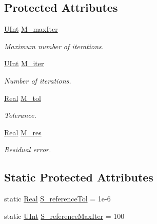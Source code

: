 \subsection*{Protected Attributes}
\begin{DoxyCompactItemize}
\item 
\hyperlink{namespaceFVCode3D_a4bf7e328c75d0fd504050d040ebe9eda}{U\+Int} \hyperlink{classFVCode3D_1_1IterativeSolver_a063b910ea559ee5c1907a611a0aa3ef5}{M\+\_\+max\+Iter}
\begin{DoxyCompactList}\small\item\em Maximum number of iterations. \end{DoxyCompactList}\item 
\hyperlink{namespaceFVCode3D_a4bf7e328c75d0fd504050d040ebe9eda}{U\+Int} \hyperlink{classFVCode3D_1_1IterativeSolver_a2804dba3a051a5380aca64d9baf623ad}{M\+\_\+iter}
\begin{DoxyCompactList}\small\item\em Number of iterations. \end{DoxyCompactList}\item 
\hyperlink{namespaceFVCode3D_a40c1f5588a248569d80aa5f867080e83}{Real} \hyperlink{classFVCode3D_1_1IterativeSolver_a9ad5ace9146a6ba76957457ead56ba07}{M\+\_\+tol}
\begin{DoxyCompactList}\small\item\em Tolerance. \end{DoxyCompactList}\item 
\hyperlink{namespaceFVCode3D_a40c1f5588a248569d80aa5f867080e83}{Real} \hyperlink{classFVCode3D_1_1IterativeSolver_a09fcf173955d9b61283e77b0fd4f2b3c}{M\+\_\+res}
\begin{DoxyCompactList}\small\item\em Residual error. \end{DoxyCompactList}\end{DoxyCompactItemize}
\subsection*{Static Protected Attributes}
\begin{DoxyCompactItemize}
\item 
static \hyperlink{namespaceFVCode3D_a40c1f5588a248569d80aa5f867080e83}{Real} \hyperlink{classFVCode3D_1_1IterativeSolver_a2afd68f254311907309444138d7f1b89}{S\+\_\+reference\+Tol} = 1e-\/6
\item 
static \hyperlink{namespaceFVCode3D_a4bf7e328c75d0fd504050d040ebe9eda}{U\+Int} \hyperlink{classFVCode3D_1_1IterativeSolver_a938effdbfaa21c23226bfedf904787c2}{S\+\_\+reference\+Max\+Iter} = 100
\end{DoxyCompactItemize}


